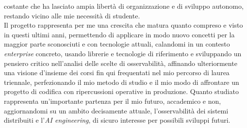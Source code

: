 costante che ha lasciato ampia libertà di organizzazione e di sviluppo
autonomo, restando vicino alle mie necessità di studente.\\
Il progetto rappresenta per me una crescita che matura quanto compreso e visto
in questi ultimi anni, permettendo di applicare in modo nuovo concetti per la
maggior parte sconosciuti e con tecnologie attuali, calandomi in un contesto
\emph{enterprise} concreto, usando librerie e tecnologie di riferimento e
sviluppando un pensiero critico nell'analisi delle scelte di osservabilità,
affinando ulteriormente una visione d'insieme dei corsi fin qui frequentati
nel mio percorso di laurea triennale, perfezionando il mio metodo di studio e
il mio modo di affrontare un progetto di codifica con ripercussioni operative
in produzione. Quanto studiato rappresenta un'importante partenza per il mio
futuro, accademico e non, aggiornandomi su un ambito decisamente attuale,
l'osservabilità dei sistemi distribuiti e l'\emph{AI engineering}, di sicuro
interesse per possibili sviluppi futuri.